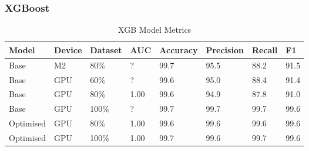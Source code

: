 \newpage

\subsubsection{XGBoost}
\label{sec:xgboost}


\begin{table}[h]
\centering
\caption{XGB Model Metrics}
\label{tab:xgb-metrics}
\begin{tabular}{|l|l|l|l|l|l|l|l|}
\hline
\textbf{Model} & \textbf{Device} & \textbf{Dataset} & \textbf{AUC} & \textbf{Accuracy} & \textbf{Precision} & \textbf{Recall} & \textbf{F1}  \\ \hline
Base & M2 & 80\% & ? & 99.7 & 95.5 & 88.2 & 91.5 \\ \hline
Base & GPU & 60\% & ? & 99.6 & 95.0 & 88.4 & 91.4 \\ \hline
Base & GPU & 80\% & 1.00 & 99.6 & 94.9 & 87.8 & 91.0 \\ \hline
Base & GPU & 100\% & ? & 99.7 & 99.7 & 99.7 & 99.6 \\ \hline
Optimised & GPU & 80\% & 1.00 & 99.6 & 99.6 & 99.6 & 99.6 \\ \hline
Optimised & GPU & 100\% & 1.00 & 99.7 & 99.6 & 99.7 & 99.6 \\ \hline
\end{tabular}
\end{table}